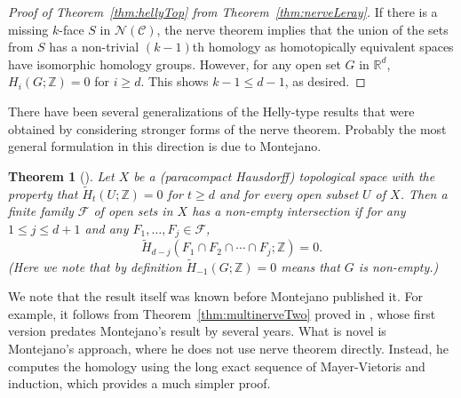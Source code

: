 \documentclass[a4paper,12pt]{amsart}
\newcommand{\R}{\mathbb{R}} 	%
\newcommand{\Z}{\mathbb{Z}} 	%
\newcommand{\F}{\mathcal{F}} 	%
\newtheorem{theorem}{Theorem}
\theoremstyle{definition}
\begin{document}
\begin{proof}[Proof of Theorem~\ref{thm:hellyTop} from Theorem~\ref{thm:nerveLeray}]
If there is a missing $k$-face $S$ in $\mathcal N(\mathcal C)$, the nerve theorem implies that the union of the sets from $S$ has a non-trivial $(k-1)$th homology as homotopically equivalent spaces have isomorphic homology groups. 
However, for any open set $G$ in $\R^d$, $H_i(G;\Z)=0$ for $i\geq d$.
This shows $k-1\leq d-1$, as desired.
\end{proof}
There have been several generalizations of the Helly-type results that were obtained by considering stronger forms of the nerve theorem. 
Probably the most general formulation in this direction is due to Montejano. 
\begin{theorem}[\cite{Montejano-Berge13}]\label{thm:montejano}
Let $X$ be a (paracompact Hausdorff) topological space with the property that $\widetilde{H}_t(U;\Z)=0$ for $t \geq d$ and for every open subset $U$ of $X$. Then a finite family $\F$ of open sets in $X$ has a non-empty intersection if for any $1\leq j\leq d+1$ and any $F_1, \ldots, F_j \in \F$, \[\widetilde{H}_{d-j}\left(F_1 \cap F_2 \cap \cdots \cap F_j;\Z\right)=0.\]
(Here we note that by definition $\widetilde{H}_{-1}(G;\Z)=0$ means that $G$ is non-empty.)
\end{theorem}
We note that the result itself was known before Montejano published it. For example, it follows from Theorem~\ref{thm:multinerveTwo} proved in \cite{multinerve13}, whose first version predates Montejano's result by several years. What is novel is Montejano's approach, where he does not use nerve theorem directly. Instead, he computes the homology using the long exact sequence of Mayer-Vietoris and induction, which provides a much simpler proof.
\end{document}
